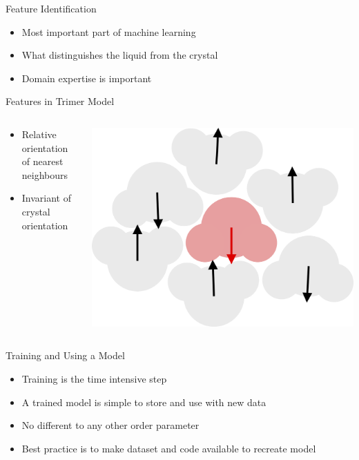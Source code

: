 \documentclass[aspectratio=169, 14pt]{beamer}
\begin{document}
\begin{frame}{Feature Identification}

  \begin{itemize}
    \item Most important part of machine learning
    \item What distinguishes the liquid from the crystal
    \item Domain expertise is important
  \end{itemize}

\end{frame}


\begin{frame}{Features in Trimer Model}

  \begin{columns}
    \begin{column}{0.5\textwidth}
      \begin{itemize}
        \item Relative orientation of nearest neighbours
        \item Invariant of crystal orientation
      \end{itemize}
    \end{column}
    \begin{column}{0.5\textwidth}
      \includegraphics[width=\textwidth]{orientations.png}
    \end{column}
  \end{columns}
\end{frame}


\begin{frame}{Training and Using a Model}

  \begin{itemize}
    \item Training is the time intensive step
    \item A trained model is simple to store and use with new data
    \item No different to any other order parameter
    \item Best practice is to make dataset and code available to recreate model
  \end{itemize}

\end{frame}
\end{document}
